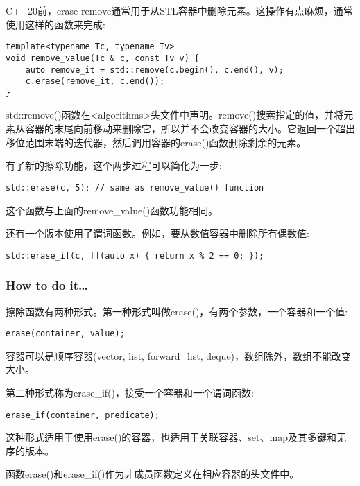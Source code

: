 
C++20前，erase-remove通常用于从STL容器中删除元素。这操作有点麻烦，通常使用这样的函数来完成:

\begin{lstlisting}[style=styleCXX]
template<typename Tc, typename Tv>
void remove_value(Tc & c, const Tv v) {
	auto remove_it = std::remove(c.begin(), c.end(), v);
	c.erase(remove_it, c.end());
}
\end{lstlisting}

std::remove()函数在<algorithms>头文件中声明。remove()搜索指定的值，并将元素从容器的末尾向前移动来删除它，所以并不会改变容器的大小。它返回一个超出移位范围末端的迭代器，然后调用容器的erase()函数删除剩余的元素。

有了新的擦除功能，这个两步过程可以简化为一步:

\begin{lstlisting}[style=styleCXX]
std::erase(c, 5); // same as remove_value() function
\end{lstlisting}

这个函数与上面的remove\_value()函数功能相同。

还有一个版本使用了谓词函数。例如，要从数值容器中删除所有偶数值:

\begin{lstlisting}[style=styleCXX]
std::erase_if(c, [](auto x) { return x % 2 == 0; });
\end{lstlisting}

\subsubsection{How to do it…}

擦除函数有两种形式。第一种形式叫做erase()，有两个参数，一个容器和一个值:

\begin{lstlisting}[style=styleCXX]
erase(container, value);
\end{lstlisting}

容器可以是顺序容器(vector, list, forward\_list, deque)，数组除外，数组不能改变大小。

第二种形式称为erase\_if()，接受一个容器和一个谓词函数:

\begin{lstlisting}[style=styleCXX]
erase_if(container, predicate);
\end{lstlisting}

这种形式适用于使用erase()的容器，也适用于关联容器、set、map及其多键和无序的版本。

函数erase()和erase\_if()作为非成员函数定义在相应容器的头文件中。

